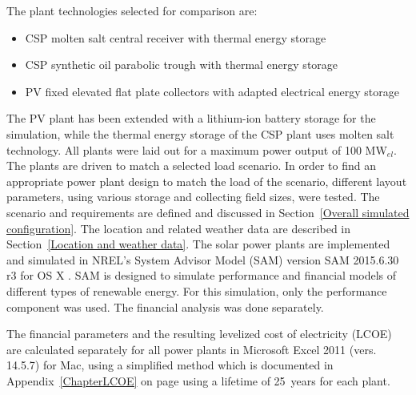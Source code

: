 The plant technologies selected for comparison are: 
\begin{itemize}
\item CSP molten salt central receiver with thermal energy storage
\item CSP synthetic oil parabolic trough with thermal energy storage
\item PV fixed elevated flat plate collectors with adapted electrical energy storage
\end{itemize}
The PV plant has been extended with a lithium-ion battery storage for the simulation, while the thermal energy storage of the CSP plant uses molten salt technology.
All plants were laid out for a maximum power output of 100 MW$_{el}$.
The plants are driven to match a selected load scenario.
In order to find an appropriate power plant design to match the load of the scenario, different layout parameters, using various storage and collecting field sizes, were tested.
The scenario and requirements are defined and discussed in Section~\ref{Overall simulated configuration}. The location and related weather data are described in Section~\ref{Location and weather data}.
The solar power plants are implemented and simulated in NREL’s System Advisor Model (SAM) version SAM 2015.6.30 r3 for OS X \cite{NREL2015}. 
SAM is designed to simulate performance and financial models of different types of renewable energy. For this simulation, only the performance component was used. The financial analysis was done separately. 

The financial parameters and the resulting levelized cost of electricity (LCOE) are calculated separately for all power plants in Microsoft Excel 2011 (vers. 14.5.7) for Mac, using a simplified method which is documented in Appendix~\ref{ChapterLCOE} on page \pageref{ChapterLCOE} using a lifetime of 25~years for each plant.

